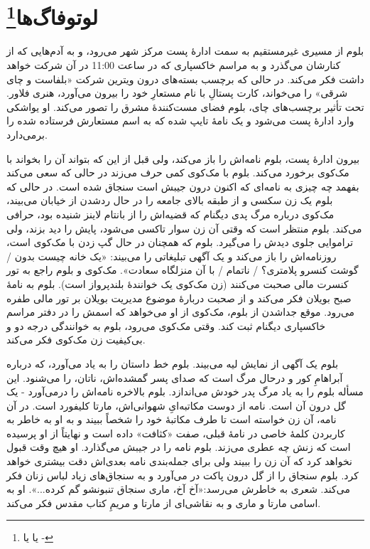 \documentclass[12pt]{book}
\begin{document}
    \chapter[لوتوفاگ‌ها]{لوتوفاگ‌ها\protect\footnote{ یا  یا -}}\label{ep:5}
    بلوم از مسیری غیرمستقیم به سمت ادارۀ پست مرکز شهر می‌رود، و به آدم‌هایی که از کنارشان می‌گذرد و به مراسم خاکسپاری که در ساعت 11:00 در آن شرکت خواهد داشت فکر می‌کند. در حالی که برچسب بسته‌های درون ویترین شرکت «بلفاست و چای شرقی» را می‌خواند، کارت پستالِ با نام مستعارِ خود را بیرون می‌آورد، هنری فلاور. تحت تأثیر برچسب‌های چای، بلوم فضای مست‌کنندۀ مشرق را تصور می‌کند. او یواشکی وارد ادارۀ پست می‌شود و یک نامۀ تایپ شده که به اسم مستعارش فرستاده شده را برمی‌دارد.

    بیرون ادارۀ پست، بلوم نامه‌اش را باز می‌کند، ولی قبل از این که بتواند آن را بخواند با مک‌کوی برخورد می‌کند. بلوم با مک‌کوی کمی حرف می‌زند در حالی که سعی می‌کند بفهمد چه چیزی به نامه‌ای که اکنون درون جیبش است سنجاق شده است. در حالی که بلوم یک زن سکسی و از طبقه بالای جامعه را در حال ردشدن از خیابان می‌بیند، مک‌کوی درباره مرگ پدی دیگنام که قضیه‌اش را از بانتام لاینز شنیده بود، حرافی می‌کند. بلوم منتظر است که وقتی آن زن سوار تاکسی می‌شود، پایش را دید بزند، ولی تراموایی جلوی دیدش را می‌گیرد. بلوم که همچنان در حال گپ زدن با مک‌کوی است، روزنامه‌اش را باز می‌کند و یک آگهی تبلیغاتی را می‌بیند: «یک خانه چیست بدون / گوشت کنسرو پلامتری؟ / ناتمام / با آن منزلگاه سعادت». مک‌کوی و بلوم راجع به تور کنسرت مالی صحبت می‌کنند (زن مک‌کوی یک خوانندۀ بلندپرواز است). بلوم به نامۀ صبح بویلان فکر می‌کند و از صحبت دربارۀ موضوع مدیریت بویلان بر تور مالی طفره می‌رود. موقع جداشدن از بلوم، مک‌کوی از او می‌خواهد که اسمش را در دفتر مراسم خاکسپاری دیگنام ثبت کند. وقتی مک‌کوی می‌رود، بلوم به خوانندگی درجه دو و بی‌کیفیت زن مک‌کوی فکر می‌کند.

    بلوم یک آگهی از نمایش لیه می‌بیند. بلوم خط داستان را به یاد می‌آورد، که درباره آبراهامِ کور و درحال مرگ است که صدای پسر گمشده‌اش، ناتان، را می‌شنود. این مسأله بلوم را به یاد مرگ پدر خودش می‌اندازد. بلوم بالاخره نامه‌اش را درمی‌آورد - یک گل درون آن است. نامه از دوست مکاتبه‌ایِ شهوانی‌اش، مارتا کلیفورد است. در آن نامه، آن زن خواسته است تا طرف مکاتبۀ خود را شخصاً ببیند و به او به خاطر به کاربردن کلمۀ خاصی در نامۀ قبلی، صفت «کثافت» داده است و نهایتاً از او پرسیده است که زنش چه عطری می‌زند. بلوم نامه را در جیبش می‌گذارد. او هیچ وقت قبول نخواهد کرد که آن زن را ببیند ولی برای جمله‌بندی نامه بعدی‌اش دقت بیشتری خواهد کرد. بلوم سنجاق را از گل درون پاکت در می‌آورد و به سنجاق‌های زیاد لباس زنان فکر می‌کند. شعری به خاطرش می‌رسد:«آخ آخ، ماری سنجاق تنبونشو گم کرده...». او به اسامی مارتا و ماری و به نقاشی‌ای از مارتا و مریمِ کتاب مقدس فکر می‌کند.
\end{document}
